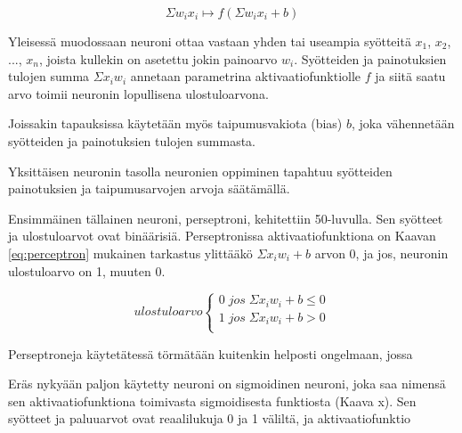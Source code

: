\documentclass[11pt]{article}
\theoremstyle{plain}
\theoremstyle{definition}
\begin{document}
    \begin{equation}
      \label{eq:neuroni}
      \Sigma w_i x_i \mapsto f(\Sigma w_i x_i + b)
    \end{equation}

    Yleisessä muodossaan neuroni ottaa vastaan yhden tai useampia syötteitä $x_1$, $x_2$, ..., $x_n$, joista kullekin on asetettu jokin painoarvo $w_i$. Syötteiden ja painotuksien tulojen summa $\Sigma x_i w_i$ annetaan parametrina aktivaatiofunktiolle $f$ ja siitä saatu arvo toimii neuronin lopullisena ulostuloarvona.
    
    Joissakin tapauksissa käytetään myös taipumusvakiota (bias) $b$, joka vähennetään syötteiden ja painotuksien tulojen summasta.

    Yksittäisen neuronin tasolla neuronien oppiminen tapahtuu syötteiden painotuksien ja taipumusarvojen arvoja säätämällä.


    Ensimmäinen tällainen neuroni, perseptroni, kehitettiin 50-luvulla. Sen syötteet ja ulostuloarvot ovat binäärisiä. Perseptronissa aktivaatiofunktiona on Kaavan \ref{eq:perceptron} mukainen tarkastus ylittääkö $\Sigma x_i w_i + b$ arvon 0, ja jos, neuronin ulostuloarvo on 1, muuten 0.
    
    \begin{equation}
      \label{eq:perceptron}
      ulostuloarvo
      \begin{cases}
        0\; jos \; \Sigma x_i w_i + b \leq 0 \\
        1\; jos \; \Sigma x_i w_i + b > 0 \\
      \end{cases}
    \end{equation}

    Perseptroneja käytetätessä törmätään kuitenkin helposti ongelmaan, jossa 

    Eräs nykyään paljon käytetty neuroni on sigmoidinen neuroni, joka saa nimensä sen aktivaatiofunktiona toimivasta sigmoidisesta funktiosta (Kaava x). Sen syötteet ja paluuarvot ovat reaalilukuja 0 ja 1 väliltä, ja aktivaatiofunktio 


\end{document}

